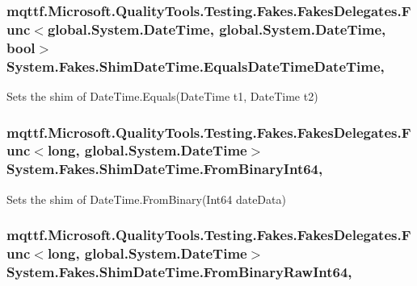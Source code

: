 \hypertarget{class_system_1_1_fakes_1_1_shim_date_time_a98a7af890ef4091653c726a02fd60f0d}{
\subsubsection[{Equals\-Date\-Time\-Date\-Time}]{\setlength{\rightskip}{0pt plus 5cm}mqttf.\-Microsoft.\-Quality\-Tools.\-Testing.\-Fakes.\-Fakes\-Delegates.\-Func$<$global.\-System.\-Date\-Time, global.\-System.\-Date\-Time, bool$>$ System.\-Fakes.\-Shim\-Date\-Time.\-Equals\-Date\-Time\-Date\-Time\hspace{0.3cm}{\ttfamily [static]}, {\ttfamily [set]}}}\label{class_system_1_1_fakes_1_1_shim_date_time_a98a7af890ef4091653c726a02fd60f0d}


Sets the shim of Date\-Time.\-Equals(\-Date\-Time t1, Date\-Time t2)

\hypertarget{class_system_1_1_fakes_1_1_shim_date_time_a4fc5043f5c4ea589b4615ac0d93863f3}{
\subsubsection[{From\-Binary\-Int64}]{\setlength{\rightskip}{0pt plus 5cm}mqttf.\-Microsoft.\-Quality\-Tools.\-Testing.\-Fakes.\-Fakes\-Delegates.\-Func$<$long, global.\-System.\-Date\-Time$>$ System.\-Fakes.\-Shim\-Date\-Time.\-From\-Binary\-Int64\hspace{0.3cm}{\ttfamily [static]}, {\ttfamily [set]}}}\label{class_system_1_1_fakes_1_1_shim_date_time_a4fc5043f5c4ea589b4615ac0d93863f3}


Sets the shim of Date\-Time.\-From\-Binary(\-Int64 date\-Data)

\hypertarget{class_system_1_1_fakes_1_1_shim_date_time_a1c868821399da399d6c28f75eef96ed4}{
\subsubsection[{From\-Binary\-Raw\-Int64}]{\setlength{\rightskip}{0pt plus 5cm}mqttf.\-Microsoft.\-Quality\-Tools.\-Testing.\-Fakes.\-Fakes\-Delegates.\-Func$<$long, global.\-System.\-Date\-Time$>$ System.\-Fakes.\-Shim\-Date\-Time.\-From\-Binary\-Raw\-Int64\hspace{0.3cm}{\ttfamily [static]}, {\ttfamily [set]}}}\label{class_system_1_1_fakes_1_1_shim_date_time_a1c868821399da399d6c28f75eef96ed4}


